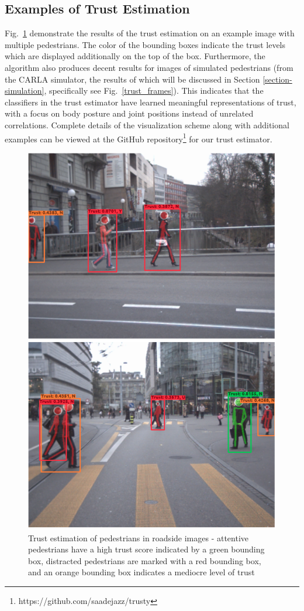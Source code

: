 \documentclass[journal]{IEEEtran}
\begin{document}
\subsection{Examples of Trust Estimation}
Fig.~\ref{example1}  demonstrate the results of the trust estimation on an example image with multiple pedestrians. The color of the bounding boxes indicate the trust levels which are displayed additionally on the top of the box. Furthermore, the algorithm also produces decent results for images of simulated pedestrians (from the CARLA simulator, the results of which will be discussed in Section \ref{section-simulation}, specifically see Fig.~\ref{trust_frames}). This indicates that the classifiers in the trust estimator have learned meaningful representations of trust, with a focus on body posture and joint positions instead of unrelated correlations. Complete details of the visualization scheme along with additional examples can be viewed at the GitHub repository\footnote{https://github.com/saadejazz/trusty} for our trust estimator.

\begin{figure}
  \centering
  \includegraphics[width=0.7\columnwidth]{example1}
  \caption{Trust estimation of pedestrians in roadside images - attentive pedestrians have a high trust score indicated by a green bounding box, distracted pedestrians are marked with a red bounding box, and an orange bounding box indicates a mediocre level of trust}
  \label{example1}
\end{figure}
\end{document}
